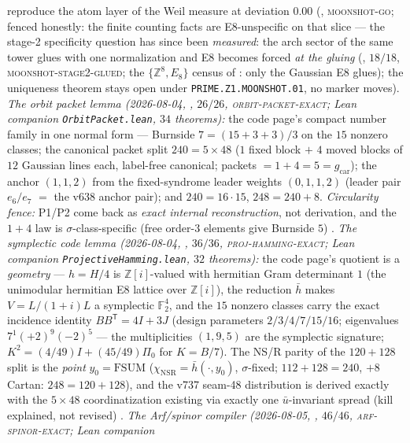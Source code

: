 \documentclass[11pt,a4paper]{article}
\newcommand{\gcar}{g_{\mathrm{car}}}
\newcommand{\Z}{\mathbb{Z}}
\theoremstyle{definition}
\begin{document}
\begin{winbox}
reproduce the atom layer of the Weil measure at deviation $0.00$
(, \textsc{moonshot-go};
fenced honestly: the finite counting facts are E8-unspecific on that
slice --- the stage-2 specificity question has since been
\emph{measured}: the arch sector of the same tower glues with one
normalization and E8 becomes forced \emph{at the gluing}
(, $18/18$,
\textsc{moonshot-stage2-glued}; the $\{\mathbb{Z}^8,E_8\}$ census of
: only the Gaussian E8 glues);
the uniqueness theorem stays open under
\texttt{PRIME.Z1.MOONSHOT.01}, no marker moves).
\emph{The orbit packet lemma (2026-08-04,
, $26/26$,
\textsc{orbit-packet-exact}; Lean companion
\texttt{OrbitPacket.lean}, $34$ theorems):} the code page's compact
number family in one normal form --- Burnside $7=(15+3+3)/3$ on the
$15$ nonzero classes; the canonical packet split $240=5\times48$
($1$ fixed block $+$ $4$ moved blocks of $12$ Gaussian lines each,
label-free canonical; packets $=1+4=5=\gcar$); the anchor $(1,1,2)$
from the fixed-syndrome leader weights $(0,1,1,2)$ (leader pair
$e_6/e_7$ $=$ the v638 anchor pair); and $240=16\cdot15$,
$248=240+8$.  \emph{Circularity fence:} P1/P2 come back as
\emph{exact internal reconstruction}, not derivation, and the $1+4$
law is $\sigma$-class-specific (free order-$3$ elements give
Burnside $5$) \mE.
\emph{The symplectic code lemma (2026-08-04,
, $36/36$,
\textsc{proj-hamming-exact}; Lean companion
\texttt{ProjectiveHamming.lean}, $32$ theorems):} the code page's
quotient is a \emph{geometry} --- $h=H/4$ is $\Z[i]$-valued with
hermitian Gram determinant $1$ (the unimodular hermitian E8 lattice
over $\Z[i]$), the reduction $\bar h$ makes $V=L/(1+i)L$ a
symplectic $\mathbb{F}_2^4$, and the $15$ nonzero classes carry the
exact incidence identity $BB^{\mathsf T}=4I+3J$ (design parameters
$2/3/4/7/15/16$; eigenvalues $7^1(+2)^9(-2)^5$ --- the
multiplicities $(1,9,5)$ are the symplectic signature;
$K^2=(4/49)I+(45/49)\Pi_0$ for $K=B/7$).  The NS/R parity of the
$120+128$ split is the \emph{point} $y_0=\mathrm{FSUM}$
($\chi_{\mathrm{NSR}}=\bar h(\cdot,y_0)$, $\sigma$-fixed;
$112+128=240$, $+8$ Cartan: $248=120+128$), and the v737 seam-48
distribution is derived exactly with the $5\times48$
coordinatization existing via exactly one $\bar u$-invariant spread
(kill explained, not revised) \mE.
\emph{The Arf/spinor compiler (2026-08-05,
, $46/46$,
\textsc{arf-spinor-exact}; Lean companion
}
\end{winbox}
\end{document}
